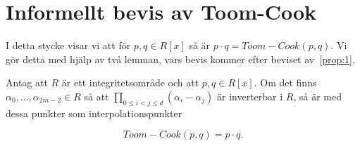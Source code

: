 \section{Informellt bevis av Toom-Cook}
\label{sec:informhuvudbevis}
I detta stycke visar vi att för $p, q \in R[x]$ så är
$p \cdot q = Toom-Cook (p, q)$. Vi gör detta med hjälp av två lemman, vars bevis
kommer efter beviset av~\ref{prop:1}.

\begin{proposition}
  \label{prop:1}
  Antag att $R$ är ett integritetsområde och att $p, q \in R[x]$. Om det finns
  $\alpha_0, \dots, \alpha_{2m-2} \in R$ så att $\prod_{0 \leq i < j \leq d}
  (\alpha_i - \alpha_j)$ är inverterbar i $R$, så är med dessa punkter som
  interpolationspunkter

  \begin{equation}
    \label{eq:name7}
    Toom-Cook (p, q) =  p \cdot q.
  \end{equation}
\end{proposition}

